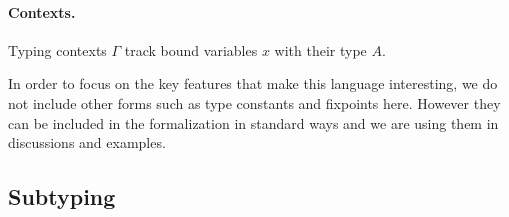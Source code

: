\paragraph{Contexts.} Typing contexts $ \Gamma $ track bound variables $x$ with their type $A$.


In order to focus on the key features that make this language interesting, we do
not include other forms such as type constants and fixpoints here. However they
can be included in the formalization in standard ways and we are using them in
discussions and examples. 


\subsection{Subtyping}


